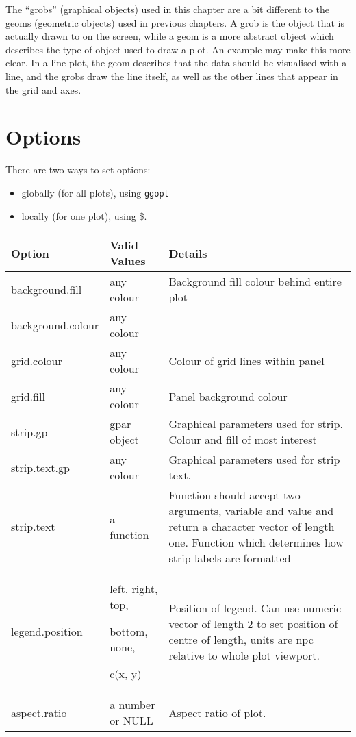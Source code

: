 The ``grobs'' (graphical objects) used in this chapter are a bit different to the geoms (geometric objects) used in previous chapters.  A grob is the object that is actually drawn to on the screen, while a geom is a more abstract object which describes the type of object used to draw a plot.  An example may make this more clear. In a line plot, the geom describes that the data should be visualised with a line, and the grobs draw the line itself, as well as the other lines that appear in the grid and axes.

\section{Options}\label{sec:options}

There are two ways to set options:

\begin{itemize}
  \item globally (for all plots), using {\tt ggopt}
  \item locally (for one plot), using \$. 
\end{itemize}     
                 
\begin{tabular}{lp{1in}p{3.6in}}
Option & Valid Values & Details \\
\hline
background.fill    & any colour & Background fill colour behind entire plot\\
background.colour  & any colour & \\
grid.colour        & any colour & Colour of grid lines within panel \\
grid.fill          & any colour & Panel background colour \\
strip.gp           & gpar object & Graphical parameters used for strip. Colour and fill of most interest \\
strip.text.gp      & any colour & Graphical parameters used for strip text. \\
strip.text         & a function & Function should accept two arguments, variable and value and return a character vector of length one. Function which determines how strip labels are formatted \\
legend.position    & left, right, top, 

bottom, none, 

c(x, y) & Position of legend.  Can use numeric vector of length 2 to set position of centre of length, units are npc relative to whole plot viewport. \\
aspect.ratio       & a number or NULL & Aspect ratio of plot. \\
\hline
\end{tabular}


